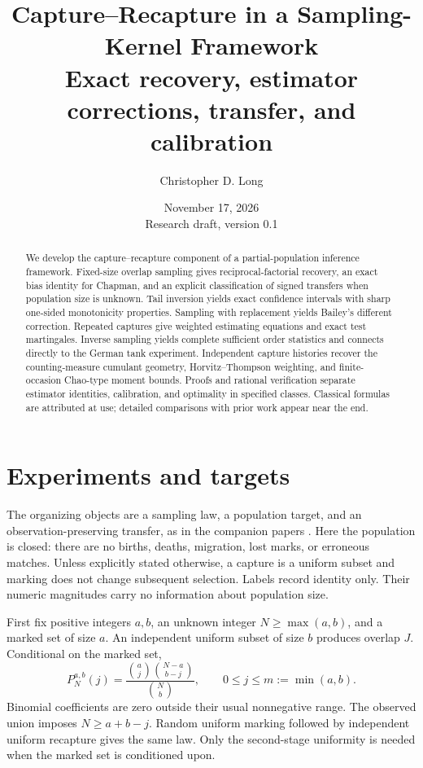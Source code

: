 \documentclass[11pt]{article}
\title{Capture--Recapture in a Sampling-Kernel Framework\\
\large Exact recovery, estimator corrections, transfer, and calibration}
\author{Christopher D. Long}
\date{November 17, 2026\\Research draft, version 0.1}
\theoremstyle{remark}\newtheorem{remark}[theorem]{Remark}
\begin{document}
\maketitle
\begin{abstract}
We develop the capture--recapture component of a partial-population inference
framework. Fixed-size overlap sampling gives reciprocal-factorial recovery,
an exact bias identity for Chapman, and an explicit classification of signed
transfers when population size is unknown. Tail inversion yields exact
confidence intervals with sharp one-sided monotonicity properties. Sampling
with replacement yields Bailey's different correction. Repeated captures give weighted estimating equations and exact test
martingales. Inverse sampling yields complete sufficient order statistics and
connects directly to the German tank experiment. Independent capture histories
recover the counting-measure cumulant geometry, Horvitz--Thompson weighting,
and finite-occasion Chao-type moment bounds. Proofs and rational verification
separate estimator identities, calibration, and optimality in specified
classes. Classical formulas are attributed at use; detailed comparisons with
prior work appear near the end.
\end{abstract}

\section{Experiments and targets}
The organizing objects are a sampling law, a population target, and an
observation-preserving transfer, as in the companion papers
\cite{LongDiscovery,LongTransfer,LongCumulants}. Here the population is closed:
there are no births, deaths, migration, lost marks, or erroneous matches.
Unless explicitly stated otherwise, a capture is a uniform subset and marking
does not change subsequent selection. Labels record identity only. Their
numeric magnitudes carry no information about population size.

First fix positive integers $a,b$, an unknown integer $N\ge\max(a,b)$,
and a marked set of size $a$. An independent uniform subset of size $b$
produces overlap $J$. Conditional on the marked set,
\begin{equation}\label{eq:kernel}
 P_N^{a,b}(j)=\frac{\binom aj\binom{N-a}{b-j}}{\binom Nb},
 \qquad 0\le j\le m:=\min(a,b).
\end{equation}
Binomial coefficients are zero outside their usual nonnegative range.
The observed union imposes $N\ge a+b-j$. Random uniform marking followed by
independent uniform recapture gives the same law. Only the second-stage
uniformity is needed when the marked set is conditioned upon.
\end{document}
